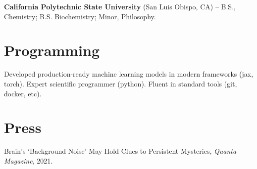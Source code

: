 \documentclass[margin,line]{res}
\begin{document}
\begin{resume}
\vspace*{-.15in}
{\bf California Polytechnic State University} (San Luis Obispo, CA) -- B.S., Chemistry; B.S. Biochemistry; Minor, Philosophy.\\

\vspace{-.5cm}
\section{\sc Programming} Developed production-ready machine learning models in modern frameworks (jax, torch). Expert scientific programmer (python). Fluent in standard tools (git, docker, etc).

\vspace{-.2cm}
\section{\sc Press}
Brain's `Background Noise' May Hold Clues to Persistent Mysteries, \emph{Quanta Magazine}, 2021. \\
    
\vspace{-.5cm} 

\end{resume}
\end{document}
